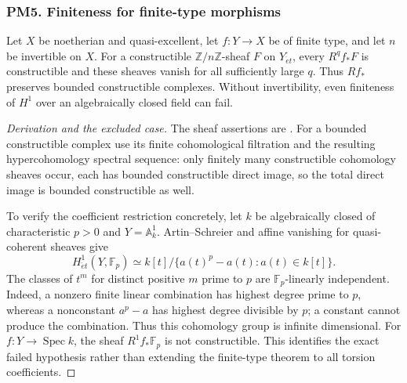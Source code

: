 \subsubsection{PM5. Finiteness for finite-type morphisms}
\begin{theorem}\label{B:PM5}
Let $X$ be noetherian and quasi-excellent, let $f:Y\to X$ be of finite type, and let $n$ be invertible on $X$. For a constructible $\mathbb Z/n\mathbb Z$-sheaf $F$ on $Y_{\acute et}$, every $R^qf_*F$ is constructible and these sheaves vanish for all sufficiently large $q$. Thus $Rf_*$ preserves bounded constructible complexes. Without invertibility, even finiteness of $H^1$ over an algebraically closed field can fail.
\end{theorem}
\begin{proof}[Derivation and the excluded case]
The sheaf assertions are \cite[Expos\'e XIII, Theorem 1.1.1, p.~179]{BILO2014}. For a bounded constructible complex use its finite cohomological filtration and the resulting hypercohomology spectral sequence: only finitely many constructible cohomology sheaves occur, each has bounded constructible direct image, so the total direct image is bounded constructible as well.

To verify the coefficient restriction concretely, let $k$ be algebraically closed of characteristic $p>0$ and $Y=\mathbb A^1_k$. Artin--Schreier and affine vanishing for quasi-coherent sheaves give
\[
 H^1_{\acute et}(Y,\mathbb F_p)
   \simeq k[t]/\{a(t)^p-a(t):a(t)\in k[t]\}.
\]
The classes of $t^m$ for distinct positive $m$ prime to $p$ are $\mathbb F_p$-linearly independent. Indeed, a nonzero finite linear combination has highest degree prime to $p$, whereas a nonconstant $a^p-a$ has highest degree divisible by $p$; a constant cannot produce the combination. Thus this cohomology group is infinite dimensional. For $f:Y\to\operatorname{Spec}k$, the sheaf $R^1f_*\mathbb F_p$ is not constructible. This identifies the exact failed hypothesis rather than extending the finite-type theorem to all torsion coefficients.
\end{proof}

